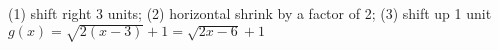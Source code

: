 {(1) shift right 3 units; (2) horizontal shrink by a factor of 2; (3) shift up 1 unit}
{$g(x) = \sqrt{2(x-3)} + 1 = \sqrt{2x-6}+1$}